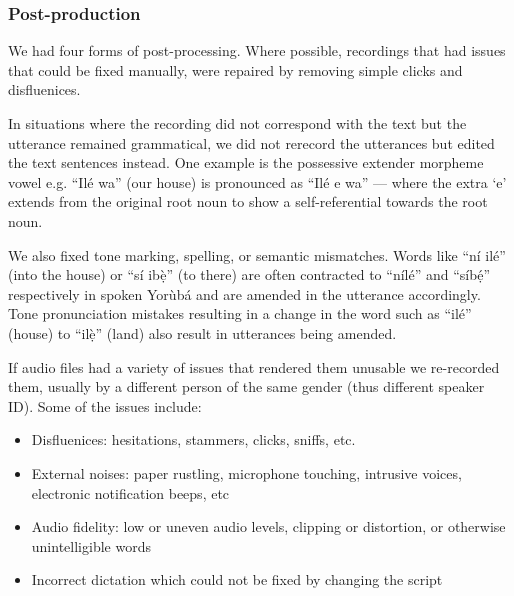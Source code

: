 \documentclass{article}
\newcommand{\Yoruba}{Yor\`{u}b\'{a} }
\begin{document}
\begin{table}[t]
    \centering
    \caption{A summary of ML-SUPERB dataset subset.}
    \label{tab:dataset_stats_ml}
\end{table}


\subsubsection{Post-production}
We had four forms of post-processing. Where possible, recordings that had issues that could be fixed manually, were repaired by removing simple clicks and disfluenices. 

In situations where the recording did not correspond with the text but the utterance remained grammatical, we did not rerecord the utterances but edited the text sentences instead. One example is the possessive extender morpheme vowel e.g. ``Il\'{e} wa'' (our house) is pronounced as ``Il\'{e} e wa'' — where the extra ‘e’ extends from the original root noun to show a self-referential towards the root noun.

We also fixed tone marking, spelling, or semantic mismatches. Words like ``n\'{i} il\'{e}'' (into the house) or ``s\'{i} ib\d{\`{e}}'' (to there) are often contracted to ``n\'{i}l\'{e}'' and ``s\'{i}b\d{\'{e}}'' respectively in spoken \Yoruba{} and are amended in the utterance accordingly. Tone pronunciation mistakes resulting in a change in the word such as ``il\'{e}'' (house) to ``il\d{\`{e}}'' (land) also result in utterances being amended. 



If audio files had a variety of issues that rendered them unusable we re-recorded them, usually by a different person of the same gender (thus different speaker ID). Some of the issues include:
\begin{itemize}
    \item Disfluenices: hesitations, stammers, clicks, sniffs, etc.
    \item External noises: paper rustling, microphone touching, intrusive voices, electronic notification beeps, etc
    \item Audio fidelity: low or uneven audio levels, clipping or distortion, or otherwise unintelligible words
    \item Incorrect dictation which could not be fixed by changing the script
\end{itemize}
\end{document}
